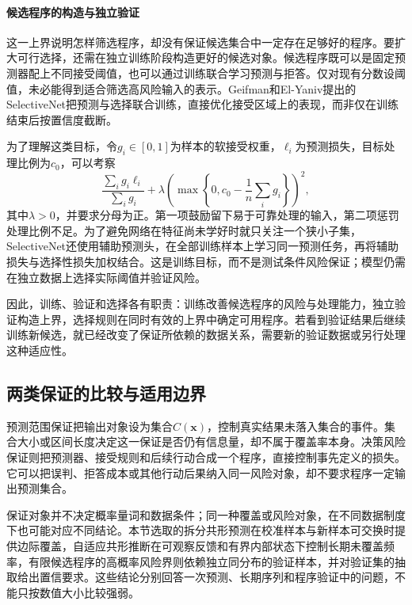 \paragraph{候选程序的构造与独立验证}

这一上界说明怎样筛选程序，却没有保证候选集合中一定存在足够好的程序。要扩大可行选择，还需在独立训练阶段构造更好的候选对象。候选程序既可以是固定预测器配上不同接受阈值，也可以通过训练联合学习预测与拒答。仅对现有分数设阈值，未必能得到适合筛选高风险输入的表示。Geifman和El-Yaniv提出的SelectiveNet把预测与选择联合训练，直接优化接受区域上的表现，而非仅在训练结束后按置信度截断。

为了理解这类目标，令$g_i\in[0,1]$为样本的软接受权重，$\ell_i$为预测损失，目标处理比例为$c_0$，可以考察
\begin{equation}
 \frac{\sum_i g_i\ell_i}{\sum_i g_i}
 +\lambda\left(\max\left\{0,c_0-\frac1n\sum_i g_i\right\}\right)^2,
 \label{eq:reliability-selective-training}
\end{equation}
其中$\lambda>0$，并要求分母为正。第一项鼓励留下易于可靠处理的输入，第二项惩罚处理比例不足。为了避免网络在特征尚未学好时就只关注一个狭小子集，SelectiveNet还使用辅助预测头，在全部训练样本上学习同一预测任务，再将辅助损失与选择性损失加权结合。这是训练目标，而不是测试条件风险保证；模型仍需在独立数据上选择实际阈值并验证风险。

因此，训练、验证和选择各有职责：训练改善候选程序的风险与处理能力，独立验证构造上界，选择规则在同时有效的上界中确定可用程序。若看到验证结果后继续训练新候选，就已经改变了保证所依赖的数据关系，需要新的验证数据或另行处理这种适应性。

\subsection{两类保证的比较与适用边界}

预测范围保证把输出对象设为集合$C(\bm{x})$，控制真实结果未落入集合的事件。集合大小或区间长度决定这一保证是否仍有信息量，却不属于覆盖率本身。决策风险保证则把预测器、接受规则和后续行动合成一个程序，直接控制事先定义的损失。它可以把误判、拒答成本或其他行动后果纳入同一风险对象，却不要求程序一定输出预测集合。

保证对象并不决定概率量词和数据条件；同一种覆盖或风险对象，在不同数据制度下也可能对应不同结论。本节选取的拆分共形预测在校准样本与新样本可交换时提供边际覆盖，自适应共形推断在可观察反馈和有界内部状态下控制长期未覆盖频率，有限候选程序的高概率风险界则依赖独立同分布的验证样本，并对验证集的抽取给出置信要求。这些结论分别回答一次预测、长期序列和程序验证中的问题，不能只按数值大小比较强弱。

